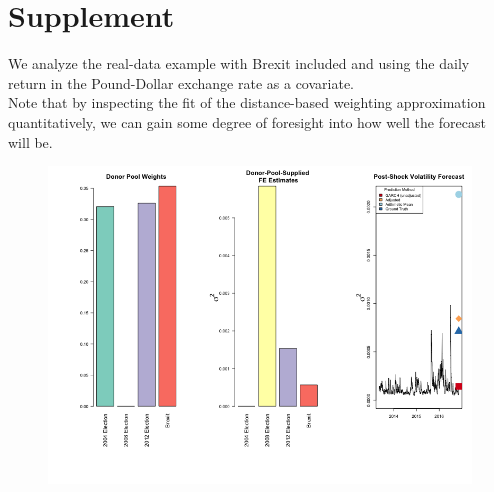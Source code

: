 \documentclass[11pt]{article}
\theoremstyle{definition}
\begin{document}

\section{Supplement}
We analyze the real-data example with Brexit included and using the daily return in the Pound-Dollar exchange rate as a covariate. \\

Note that by inspecting the fit of the distance-based weighting approximation quantitatively, we can gain some degree of foresight into how well the forecast will be.



\begin{figure}[H]
  \begin{center}
    \includegraphics[scale=.6]{real_data_output_plots/savetime_SatMay112046072024_IYG_CL=F-^VIX-^IRX-^FVX-^TNX-^TYX_^VIX_2016-11-08-2004-11-02-2008-11-04-2012-11-06-2016-06-22.png}
    \label{fig:SVF_2016_without_Brexit}
    \end{center}
  \end{figure}

\clearpage



 
\end{document}
